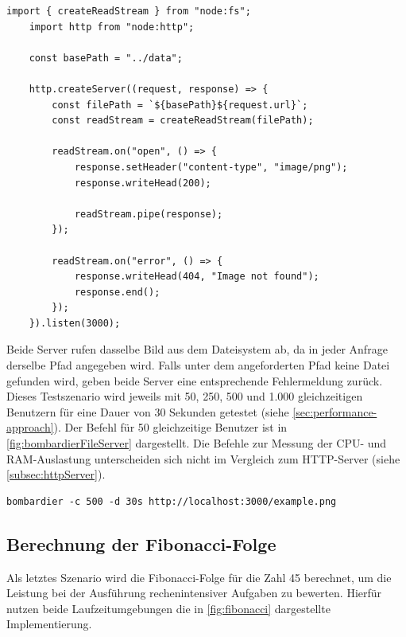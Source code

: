 \begin{lstlisting}[caption={[Datei-Server Node.js]Datei-Server Node.js\\\textit{Quelle: Eigene Darstellung}},label={fig:fileServerNode}]
	import { createReadStream } from "node:fs";
	import http from "node:http";
	
	const basePath = "../data";
	
	http.createServer((request, response) => {
		const filePath = `${basePath}${request.url}`;
		const readStream = createReadStream(filePath);
		
		readStream.on("open", () => {
			response.setHeader("content-type", "image/png");
			response.writeHead(200);
			
			readStream.pipe(response);
		});
		
		readStream.on("error", () => {
			response.writeHead(404, "Image not found");
			response.end();
		});
	}).listen(3000);
\end{lstlisting}

\noindent
Beide Server rufen dasselbe Bild aus dem Dateisystem ab, da in jeder Anfrage derselbe Pfad angegeben wird. Falls unter dem angeforderten Pfad keine Datei gefunden wird, geben beide Server eine entsprechende Fehlermeldung zurück. Dieses Testszenario wird jeweils mit 50, 250, 500 und 1.000 gleichzeitigen Benutzern für eine Dauer von 30 Sekunden getestet (siehe \autoref{sec:performance-approach}). Der Befehl für 50 gleichzeitige Benutzer ist in \autoref{fig:bombardierFileServer} dargestellt. Die Befehle zur Messung der CPU- und RAM-Auslastung unterscheiden sich nicht im Vergleich zum HTTP-Server (siehe \autoref{subsec:httpServer}).

\begin{lstlisting}[caption={[Bombardier Datei-Server]Bombardier Datei-Server\\\textit{Quelle: Eigene Darstellung}},label={fig:bombardierFileServer}]
	bombardier -c 500 -d 30s http://localhost:3000/example.png
\end{lstlisting}

\subsection{Berechnung der Fibonacci-Folge} \label{subsec:fibonacci}
Als letztes Szenario wird die Fibonacci-Folge für die Zahl 45 berechnet, um die Leistung bei der Ausführung rechenintensiver Aufgaben zu bewerten. Hierfür nutzen beide Laufzeitumgebungen die in \autoref{fig:fibonacci} dargestellte Implementierung.

